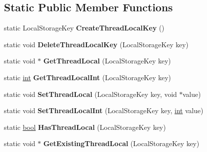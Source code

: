 \subsection*{Static Public Member Functions}
\begin{DoxyCompactItemize}
\item 
\mbox{\label{classv8_1_1base_1_1Thread_abc63f50589a8aa1cfc856f625bb1cee6}} 
static Local\+Storage\+Key {\bfseries Create\+Thread\+Local\+Key} ()
\item 
\mbox{\label{classv8_1_1base_1_1Thread_a7200eefbe28a522417b36aae04021948}} 
static void {\bfseries Delete\+Thread\+Local\+Key} (Local\+Storage\+Key key)
\item 
\mbox{\label{classv8_1_1base_1_1Thread_ac67b609a15f0a5753e1aa51e9ca612e7}} 
static void $\ast$ {\bfseries Get\+Thread\+Local} (Local\+Storage\+Key key)
\item 
\mbox{\label{classv8_1_1base_1_1Thread_a701eea751770634a5f94e76c219f5d95}} 
static \mbox{\hyperlink{classint}{int}} {\bfseries Get\+Thread\+Local\+Int} (Local\+Storage\+Key key)
\item 
\mbox{\label{classv8_1_1base_1_1Thread_afead45228e4beabf84527e07159af24e}} 
static void {\bfseries Set\+Thread\+Local} (Local\+Storage\+Key key, void $\ast$value)
\item 
\mbox{\label{classv8_1_1base_1_1Thread_adbfc14f059c50bc461e84f4e2edacb2c}} 
static void {\bfseries Set\+Thread\+Local\+Int} (Local\+Storage\+Key key, \mbox{\hyperlink{classint}{int}} value)
\item 
\mbox{\label{classv8_1_1base_1_1Thread_aef314b004eff7370f34cd92d8eaa1530}} 
static \mbox{\hyperlink{classbool}{bool}} {\bfseries Has\+Thread\+Local} (Local\+Storage\+Key key)
\item 
\mbox{\label{classv8_1_1base_1_1Thread_ace7e08cfb836780a435c23ffc0bb0a06}} 
static void $\ast$ {\bfseries Get\+Existing\+Thread\+Local} (Local\+Storage\+Key key)
\end{DoxyCompactItemize}
